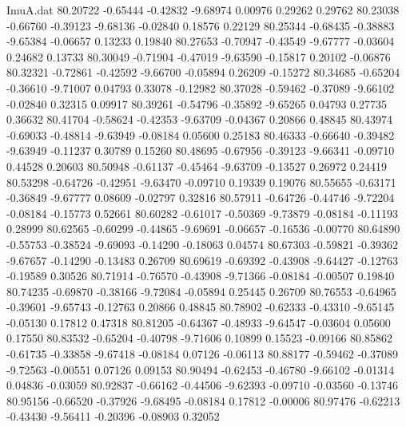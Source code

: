 \begin{filecontents}{ImuA.dat}
  80.20722   -0.65444   -0.42832   -9.68974    0.00976    0.29262    0.29762
  80.23038   -0.66760   -0.39123   -9.68136   -0.02840    0.18576    0.22129
  80.25344   -0.68435   -0.38883   -9.65384   -0.06657    0.13233    0.19840
  80.27653   -0.70947   -0.43549   -9.67777   -0.03604    0.24682    0.13733
  80.30049   -0.71904   -0.47019   -9.63590   -0.15817    0.20102   -0.06876
  80.32321   -0.72861   -0.42592   -9.66700   -0.05894    0.26209   -0.15272
  80.34685   -0.65204   -0.36610   -9.71007    0.04793    0.33078   -0.12982
  80.37028   -0.59462   -0.37089   -9.66102   -0.02840    0.32315    0.09917
  80.39261   -0.54796   -0.35892   -9.65265    0.04793    0.27735    0.36632
  80.41704   -0.58624   -0.42353   -9.63709   -0.04367    0.20866    0.48845
  80.43974   -0.69033   -0.48814   -9.63949   -0.08184    0.05600    0.25183
  80.46333   -0.66640   -0.39482   -9.63949   -0.11237    0.30789    0.15260
  80.48695   -0.67956   -0.39123   -9.66341   -0.09710    0.44528    0.20603
  80.50948   -0.61137   -0.45464   -9.63709   -0.13527    0.26972    0.24419
  80.53298   -0.64726   -0.42951   -9.63470   -0.09710    0.19339    0.19076
  80.55655   -0.63171   -0.36849   -9.67777    0.08609   -0.02797    0.32816
  80.57911   -0.64726   -0.44746   -9.72204   -0.08184   -0.15773    0.52661
  80.60282   -0.61017   -0.50369   -9.73879   -0.08184   -0.11193    0.28999
  80.62565   -0.60299   -0.44865   -9.69691   -0.06657   -0.16536   -0.00770
  80.64890   -0.55753   -0.38524   -9.69093   -0.14290   -0.18063    0.04574
  80.67303   -0.59821   -0.39362   -9.67657   -0.14290   -0.13483    0.26709
  80.69619   -0.69392   -0.43908   -9.64427   -0.12763   -0.19589    0.30526
  80.71914   -0.76570   -0.43908   -9.71366   -0.08184   -0.00507    0.19840
  80.74235   -0.69870   -0.38166   -9.72084   -0.05894    0.25445    0.26709
  80.76553   -0.64965   -0.39601   -9.65743   -0.12763    0.20866    0.48845
  80.78902   -0.62333   -0.43310   -9.65145   -0.05130    0.17812    0.47318
  80.81205   -0.64367   -0.48933   -9.64547   -0.03604    0.05600    0.17550
  80.83532   -0.65204   -0.40798   -9.71606    0.10899    0.15523   -0.09166
  80.85862   -0.61735   -0.33858   -9.67418   -0.08184    0.07126   -0.06113
  80.88177   -0.59462   -0.37089   -9.72563   -0.00551    0.07126    0.09153
  80.90494   -0.62453   -0.46780   -9.66102   -0.01314    0.04836   -0.03059
  80.92837   -0.66162   -0.44506   -9.62393   -0.09710   -0.03560   -0.13746
  80.95156   -0.66520   -0.37926   -9.68495   -0.08184    0.17812   -0.00006
  80.97476   -0.62213   -0.43430   -9.56411   -0.20396   -0.08903    0.32052

\end{filecontents}
